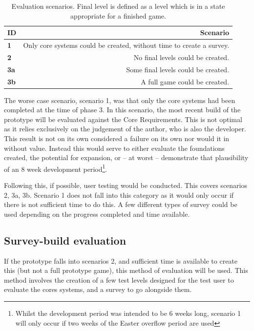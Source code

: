 \begin{table}[h]
    \centering
    \begin{tabular}{lr}\toprule
        \textbf{ID} & \textbf{Scenario}  \\\midrule
        \textbf{1} & Only core systems could be created, without time to create a survey. \\
        \textbf{2} & No final levels could be created. \\ 
        \textbf{3a} & Some final levels could be created. \\
        \textbf{3b} & A full game could be created. \\
    \bottomrule\end{tabular}
    \caption{Evaluation scenarios. Final level is defined as a level which is in a state appropriate for a finished game.}
    \label{tab:evaluationScenarios}
\end{table}

The worse case scenario, scenario 1, was that only the core systems had been completed at the time of phase 3. In this scenario, the most recent build of the prototype will be evaluated against the Core Requirements. This is not optimal as it relies exclusively on the judgement of the author, who is also the developer. This result is not on its own considered a failure on its own nor would it in without value. Instead this would serve to either evaluate the foundations created, the potential for expansion, or -- at worst -- demonstrate that plausibility of an 8 week development period\footnote{Whilst the development period was intended to be 6 weeks long, scenario 1 will only occur if two weeks of the Easter overflow period are used}.

Following this, if possible, user testing would be conducted. This covers scenarios 2, 3a, 3b. Scenario 1 does not fall into this category as it would only occur if there is not sufficient time to do this. A few different types of survey could be used depending on the progress completed and time available.

\subsection{Survey-build evaluation}

If the prototype falls into scenarios 2, and sufficient time is available to create this (but not a full prototype game), this method of evaluation will be used. This method involves the creation of a few test levels designed for the test user to evaluate the cores systems, and a survey to go alongside them.

